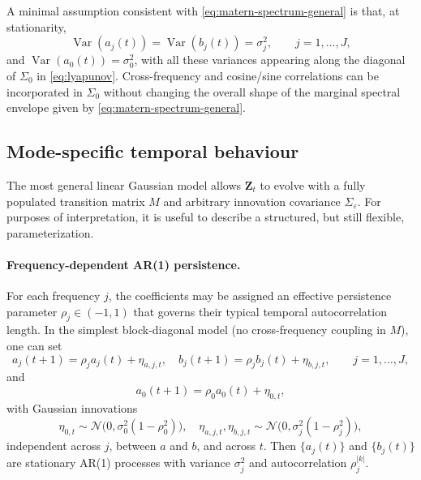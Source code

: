 \documentclass[answers,12pt,addpoints]{exam}
\begin{document}
A minimal assumption consistent with \eqref{eq:matern-spectrum-general} is that, at stationarity,
\begin{equation}
  \operatorname{Var}(a_j(t)) = \operatorname{Var}(b_j(t)) = \sigma_j^2,
  \qquad j=1,\dots,J,
  \label{eq:marginal-modes}
\end{equation}
and $\operatorname{Var}(a_0(t)) = \sigma_0^2$, with all these variances appearing along the diagonal of $\Sigma_0$ in \eqref{eq:lyapunov}. Cross-frequency and cosine/sine correlations can be incorporated in $\Sigma_0$ without changing the overall shape of the marginal spectral envelope given by \eqref{eq:matern-spectrum-general}.

\subsection{Mode-specific temporal behaviour}

The most general linear Gaussian model allows $\mathbf{Z}_t$ to evolve with a fully populated transition matrix $M$ and arbitrary innovation covariance $\Sigma_\varepsilon$. For purposes of interpretation, it is useful to describe a structured, but still flexible, parameterization.

\paragraph{Frequency-dependent AR(1) persistence.}  
For each frequency $j$, the coefficients may be assigned an effective persistence parameter $\rho_j \in (-1,1)$ that governs their typical temporal autocorrelation length. In the simplest block-diagonal model (no cross-frequency coupling in $M$), one can set
\begin{equation}
  a_j(t+1) = \rho_j a_j(t) + \eta_{a,j,t}, \quad
  b_j(t+1) = \rho_j b_j(t) + \eta_{b,j,t},
  \qquad j=1,\dots,J,
  \label{eq:simple-ar1-modes}
\end{equation}
and
\begin{equation}
  a_0(t+1) = \rho_0 a_0(t) + \eta_{0,t},
  \label{eq:simple-ar1-mean}
\end{equation}
with Gaussian innovations
\[
  \eta_{0,t} \sim \mathcal{N}\bigl(0, \sigma_0^2 (1 - \rho_0^2)\bigr),
  \quad
  \eta_{a,j,t},\eta_{b,j,t} \sim \mathcal{N}\bigl(0, \sigma_j^2 (1 - \rho_j^2)\bigr),
\]
independent across $j$, between $a$ and $b$, and across $t$. Then $\{a_j(t)\}$ and $\{b_j(t)\}$ are stationary AR(1) processes with variance $\sigma_j^2$ and autocorrelation $\rho_j^{|k|}$.
\end{document}
